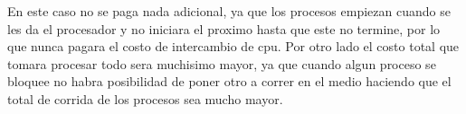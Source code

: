 \documentclass[11pt]{article}
\begin{document}
En este caso no se paga nada adicional, ya que los procesos empiezan cuando se les da el procesador y no iniciara el proximo hasta que este no termine, por lo que nunca pagara el costo de intercambio de cpu. Por otro lado el costo total que tomara procesar todo sera muchisimo mayor, ya que cuando algun proceso se bloquee no habra posibilidad de poner otro a correr en el medio haciendo que el total de corrida de los procesos sea mucho mayor.
\end{document}
